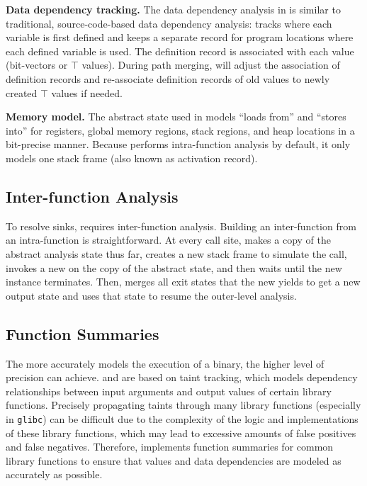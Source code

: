 \smallskip
\noindent
\textbf{Data dependency tracking.}
The data dependency analysis in \rda is similar to traditional, source-code-based data dependency analysis:
\rda tracks where each variable is first defined and keeps a separate record for program locations where each defined variable is used.
The definition record is associated with each value (bit-vectors or $\top$ values).
During path merging, \rda will adjust the association of definition records and re-associate definition records of old values to newly created $\top$ values if needed.

\smallskip
\noindent
\textbf{Memory model.}
The abstract state used in \rda models ``loads from'' and ``stores into'' for registers, global memory regions, stack regions, and heap locations in a bit-precise manner.
Because \rda performs intra-function analysis by default, it only models one stack frame (also known as activation record).

\subsection{Inter-function Analysis}
To resolve sinks, \mango requires inter-function analysis.
Building an inter-function \rda from an intra-function \rda is straightforward.
At every call site, \mango makes a copy of the abstract analysis state thus far, creates a new stack frame to simulate the call, invokes a new \rda on the copy of the abstract state, and then waits until the new \rda instance terminates.
Then, \mango merges all exit states that the new \rda yields to get a new output state and uses that state to resume the outer-level \rda analysis.

\subsection{Function Summaries}
\label{sec:function_handlers}

The more accurately \rda models the execution of a binary, the higher level of precision \mango can achieve.
\karonte and \satc are based on taint tracking, which models dependency relationships between input arguments and output values of certain library functions.
Precisely propagating taints through many library functions (especially in \texttt{glibc}) can be difficult due to the complexity of the logic and implementations of these library functions, which may lead to excessive amounts of false positives and false negatives.
Therefore, \mango implements function summaries for common library functions to ensure that values and data dependencies are modeled as accurately as possible.

